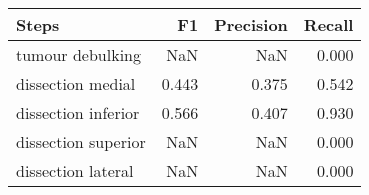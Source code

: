 \begin{tabular}{lrrr}
\toprule
Steps & F1 & Precision & Recall \\
\midrule
tumour debulking & NaN & NaN & 0.000 \\
dissection medial & 0.443 & 0.375 & 0.542 \\
dissection inferior & 0.566 & 0.407 & 0.930 \\
dissection superior & NaN & NaN & 0.000 \\
dissection lateral & NaN & NaN & 0.000 \\
\bottomrule
\end{tabular}

